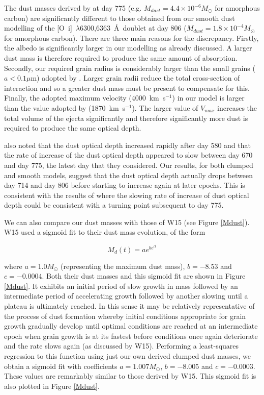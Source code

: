 \documentclass[useAMS,usenatbib,usegraphicx]{mnras}
\begin{document}
The dust masses derived by \citet{Lucy1989} at day 775 (e.g. $M_{dust}=4.4 \times 10^{-6} M_{\odot}$ for amorphous carbon) are significantly different to those obtained from our smooth dust modelling of the [O~{\sc i}]~$\lambda$6300,6363~\AA\ doublet at day 806 ($M_{dust}=1.8 \times 10^{-4} M_{\odot}$ for amorphous carbon).  There are three main reasons for the discrepancy.  Firstly, the albedo is significantly larger in our modelling as already discussed.  A larger dust mass is therefore required to produce the same amount of absorption.  Secondly, our required grain radius is considerably larger than the small grains ($a < 0.1\mu$m) adopted by \citet{Lucy1989}. Larger grain radii reduce the total cross-section of interaction and so a greater dust mass must be present to compensate for this. Finally, the adopted maximum velocity (4000~km~s$^{-1}$) in our model is larger than the value adopted by \citet{Lucy1989} (1870~km~s$^{-1}$).  The larger value of $V_{max}$ increases the total volume of the ejecta significantly and therefore significantly more dust is required to produce the same optical depth.

\citet{Lucy1989} also noted that the dust optical depth increased rapidly after day 580 and that the rate of increase of the dust optical depth appeared to slow between day 670 and day 775, the latest day that they considered.  Our results, for both clumped and smooth models, suggest that the dust optical depth actually drops between day 714 and day 806 before starting to increase again at later epochs.  This is consistent with the results of \citet{Lucy1989} where the slowing rate of increase of dust optical depth could be consistent with a turning point subsequent to day 775.  

We can also compare our dust masses with those of W15 (see Figure \ref{Mdust}).  W15 used a sigmoid 
fit to their dust mass evolution, of the form

\begin{equation}
M_d(t)=ae^{be^{ct}}
\end{equation}
 
\noindent where  $a=1.0M_{\odot}$ (representing the maximum 
dust mass), $b=-8.53$ and $c=-0.0004$.  Both their dust masses and this 
sigmoid fit are shown in Figure \ref{Mdust}.  It exhibits an initial 
period of slow growth in mass followed by an intermediate period of accelerating growth
followed by another slowing until a plateau is ultimately reached.  In 
this sense it may be relatively representative of the process of dust 
formation whereby initial conditions appropriate for grain growth 
gradually develop until optimal conditions are reached at an intermediate 
epoch when grain growth is at its fastest before conditions once again 
deteriorate and the rate slows again (as discussed by W15).  Performing a 
least-squares regression to this function using just our own derived clumped dust masses, 
we obtain a sigmoid fit with coefficients $a=1.007M_{\odot}$, $b=-8.005$ 
and $c=-0.0003$.  These values are remarkably similar to those derived 
by W15.  This sigmoid fit is also plotted in Figure \ref{Mdust}.
\end{document}
